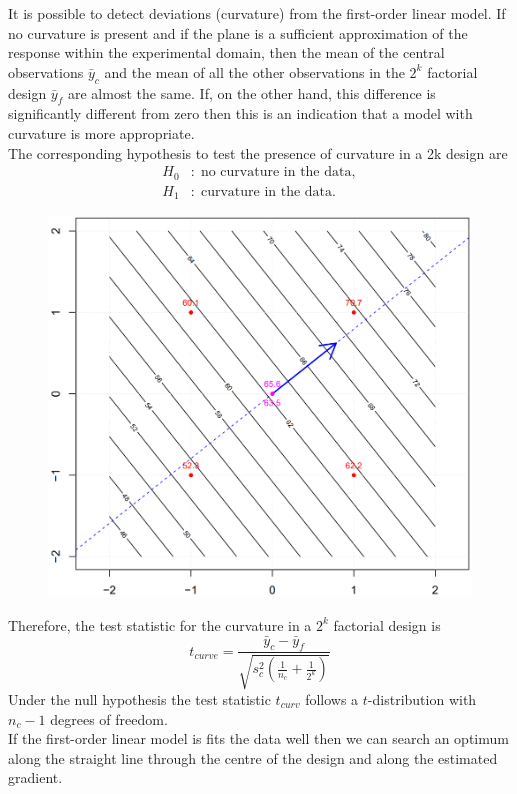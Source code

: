 It is possible to detect deviations (curvature) from the first-order linear model. If no curvature is present and if the plane is a sufficient approximation of the response within the experimental domain, then the mean of the central observations $\bar{y}_c$ and the mean of all the other observations in the $2^k$ factorial design $\bar{y}_f$ are almost the same. If, on the other hand, this difference is significantly different from zero then this is an indication that a model with curvature is more appropriate.\\
The corresponding hypothesis to test the presence of curvature in a 2k design are
\begin{equation}
  \begin{split}
    H_0 &: \;\text{no curvature in the data},\\
    H_1 &: \;\text{curvature in the data}.
  \end{split}
\end{equation}

\begin{figure}[H]
  \centering
  \includegraphics[width=.6\linewidth]{Pics/15.1.2.png}
\end{figure}

Therefore, the test statistic for the curvature in a $2^k$ factorial design is
\begin{equation}
  t_{curve} = \frac{\bar{y}_c -\bar{y}_f}{\sqrt{s_c^2 \left(\frac{1}{n_c} + \frac{1}{2^k}\right)}}
\end{equation}
Under the null hypothesis the test statistic $t_{curv}$ follows a $t$-distribution with $n_c - 1$ degrees of freedom.\\
If the first-order linear model is fits the data well then we can search an optimum along the straight line through the centre of the design and along the estimated gradient.

